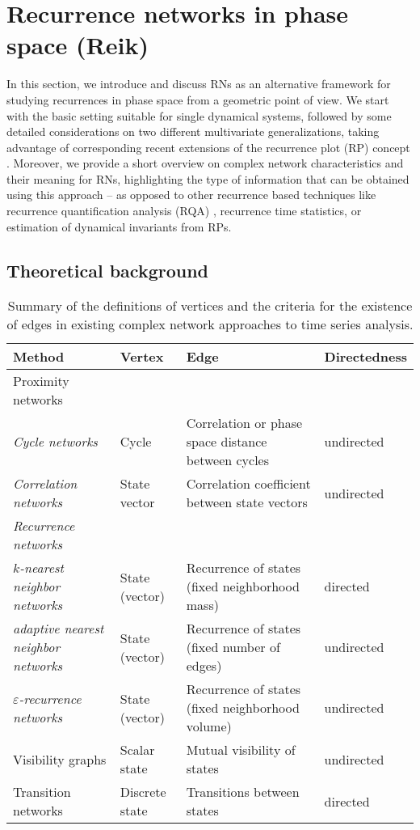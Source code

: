 \section{Recurrence networks in phase space {\bf{(Reik)}}}

In this section, we introduce and discuss RNs as an alternative framework for studying recurrences in phase space from a geometric point of view. We start with the basic setting suitable for single dynamical systems, followed by some detailed considerations on two different multivariate generalizations, taking advantage of corresponding recent extensions \cite{Zbilut1998,Romano2004PLA} of the recurrence plot (RP) concept \cite{Eckmann1987,marwan2007}. Moreover, we provide a short overview on complex network characteristics and their meaning for RNs, highlighting the type of information that can be obtained using this approach -- as opposed to other recurrence based techniques like recurrence quantification analysis (RQA) \cite{zbilut92,trulla96}, recurrence time statistics, or estimation of dynamical invariants from RPs.


\subsection{Theoretical background}

\begin{table}[t]%
\caption{Summary of the definitions of vertices and the criteria for the
existence of edges in existing complex network approaches to time series analysis.}{
\small
\begin{tabular}{llll}
\hline
Method & Vertex & Edge & Directedness \\
\hline
Proximity networks & & \\
\textit{Cycle networks} & Cycle & Correlation or phase space distance between cycles & undirected \\
\textit{Correlation networks} & State vector & Correlation coefficient between state vectors & undirected \\
\textit{Recurrence networks} & & & \\
\quad \textit{$k$-nearest neighbor networks}& State (vector) & Recurrence of states (fixed neighborhood mass) & directed \\
\quad \textit{adaptive nearest neighbor networks}& State (vector)  & Recurrence of states (fixed number of edges) & undirected \\
\quad \textit{$\varepsilon$-recurrence networks} & State (vector) & Recurrence of states (fixed neighborhood volume) & undirected \\
\hline
Visibility graphs & Scalar state & Mutual visibility of states & undirected \\
\hline
Transition networks & Discrete state & Transitions between states & directed \\
\hline
\end{tabular}
\normalsize
\label{tab:methods}}
\end{table}


